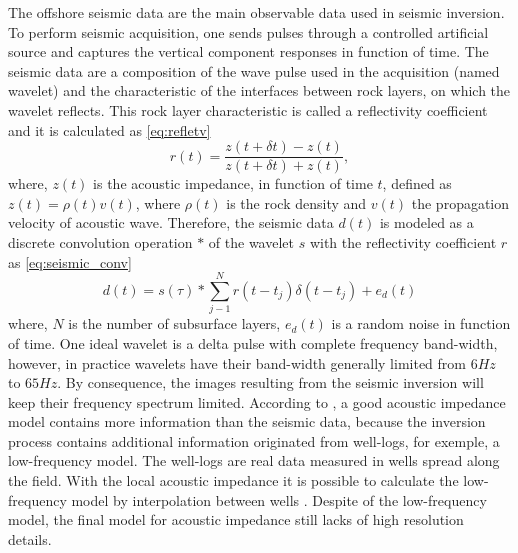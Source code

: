 \documentclass[conference]{IEEEtran}
\begin{document}
The offshore seismic data are the main observable data used in seismic inversion. To perform seismic acquisition,
one sends pulses through a controlled artificial source and captures
the vertical component responses in function of time. The seismic data are a composition of
the wave pulse used in the acquisition (named wavelet) and the characteristic of the interfaces between rock layers,
on which the wavelet reflects. This rock layer characteristic is called a reflectivity coefficient and it is
calculated as \eqref{eq:refletv}
\begin{equation}
r(t) = \frac{z(t+\delta t)-z(t)}{z(t+\delta t)+z(t)},
\label{eq:refletv}
\end{equation}
where, $z(t)$ is the acoustic impedance, in function of time $t$, defined as 
$z(t)=\rho(t)v(t)$, where $\rho(t)$ is the rock density and $v(t)$ the propagation velocity
of acoustic wave.
Therefore, the seismic data  $d(t)$ is modeled as a discrete convolution operation $*$ of the wavelet $s$ with the
reflectivity coefficient $r$ as \eqref{eq:seismic_conv}
\begin{equation}
d(t) = s(\tau) * \sum_{j-1}^{N}{r(t- t_j) \delta(t - t_j) + e_d(t)}
\label{eq:seismic_conv}
\end{equation}
where, $N$ is the number of subsurface layers, $e_d(t)$ is a random noise in function of time.
One ideal wavelet is a delta pulse with complete frequency band-width, however, in practice
wavelets have their band-width generally limited from $6Hz$ to $65Hz$. By consequence,
the images resulting from the seismic inversion will keep their frequency spectrum limited.
According to \cite{Latimer2017}, a good acoustic impedance model contains more information
than the seismic data, because the inversion process contains additional information originated from well-logs, for
exemple, a low-frequency model.
The well-logs are real data measured in wells spread along the field.
With the local acoustic impedance it is possible to calculate the low-frequency
model by interpolation between wells \cite{Buland2003,Figueiredo2012}. Despite of the
low-frequency model, the final model for acoustic impedance still lacks of high resolution details.
\end{document}
